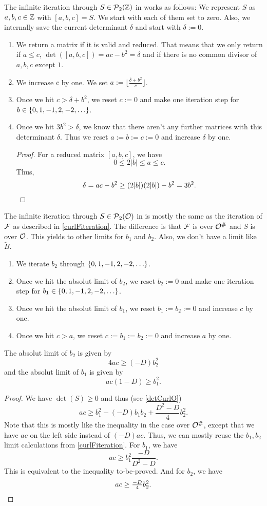 The infinite iteration through $S \in \operatorname{\mathcal{P}}_2(\mathbb{Z})$ in  works as follows: We represent $S$ as $a,b,c \in \mathbb{Z}$ with $[a,b,c] = S$. We start with each of them set to zero. Also, we internally save the current determinant $\delta$ and start with $\delta := 0$.
\begin{enumerate}
\item We return a matrix if it is valid and reduced. That means that we only return if $a \le c$, $\det([a,b,c]) = ac - b^2 = \delta$ and if there is no common divisor of $a,b,c$ except $1$.
\item We increase $c$ by one. We set $a := \lfloor \frac{\delta + b^2}{c} \rfloor$.
\item Once we hit $c > \delta + b^2$, we reset $c := 0$ and make one iteration step for
$b \in \Set{0,1,-1,2,-2,\dots}$.
\item
Once we hit $3 b^2 > \delta$, we know that there aren't any further matrices with this determinant $\delta$. Thus we reset $a := b := c := 0$ and increase $\delta$ by one.
\begin{proof}
For a reduced matrix $[a,b,c]$, we have
\[ 0 \le 2 |b| \le a \le c . \]
Thus,
\[ \delta = ac - b^2 \ge (2 |b|) (2 |b|) - b^2 = 3 b^2 . \qedhere \]
\end{proof}
\end{enumerate}

The infinite iteration through $S \in \operatorname{\mathcal{P}}_2(\mathcal{O})$ in  is mostly the same as the iteration of $\mathcal{F}$ as described in \cref{curlFiteration}. The difference is that $\mathcal{F}$ is over $\mathcal{O}^\#$ and $S$ is over $\mathcal{O}$. This yields to other limits for $b_1$ and $b_2$. Also, we don't have a limit like $\tilde{B}$.
\begin{enumerate}
\item We iterate $b_2$ through $\Set{0,1,-1,2,-2,\dots}$.
\item Once we hit the absolut limit of $b_2$, we reset $b_2 := 0$ and make one iteration step for $b_1 \in \Set{0,1,-1,2,-2,\dots}$.
\item Once we hit the absolut limit of $b_1$, we reset $b_1 := b_2 := 0$ and increase $c$ by one.
\item Once we hit $c > a$, we reset $c := b_1 := b_2 := 0$ and increase $a$ by one.
\end{enumerate}
%
The absolut limit of $b_2$ is given by
\[ 4 ac \ge (-D) b_2^2 \]
and the absolut limit of $b_1$ is given by
\[ ac (1 - D) \ge b_1^2 . \]
\begin{proof}
We have $\det(S) \ge 0$ and thus
(see \cref{detCurlO})
\[ a c \ge b_1^2 - (-D) b_1 b_2 + \frac{D^2 - D}{4} b_2^2 . \]
Note that this is mostly like the inequality in the case over $\mathcal{O}^\#$, except that we have $ac$ on the left side instead of $(-D) ac$. Thus, we can mostly reuse the $b_1, b_2$ limit calculations from \cref{curlFiteration}. For $b_1$, we have
\[ a c \ge b_1^2 \frac{-D}{D^2-D} . \]
This is equivalent to the inequality to-be-proved.
And for $b_2$, we have
\[ a c \ge \tfrac{-D}{4} b_2^2 . \qedhere \]
\end{proof}


